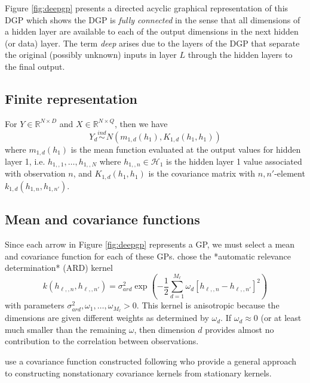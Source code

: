 \documentclass{article}
\newcommand{\ind}{\stackrel{ind}{\sim}}
\begin{document}
Figure \ref{fig:deepgp} presents a directed acyclic graphical representation
of this DGP which shows the DGP is \emph{fully connected} in the sense that all 
dimensions of a hidden layer are available to each of the output dimensions 
in the next hidden (or data) layer. 
The term \emph{deep} arises due to the layers of the DGP that separate
the original (possibly unknown) inputs in layer $L$ through the hidden layers
to the final output.







\subsection{Finite representation}

For $Y \in \mathbb{R}^{N \times D}$ and $X\in \mathbb{R}^{N\times Q}$,
then we have 
\[
Y_d \ind N(m_{1,d}(h_1), K_{1,d}(h_1,h_1))
\]
where 
$m_{1,d}(h_1)$ is the mean function evaluated at the output values for 
hidden layer 1, i.e. $h_{1,,1},\ldots,h_{1,,N}$ where $h_{1,,n}\in \mathcal{H}_1$
is the hidden layer 1 value associated with observation $n$, and 
$K_{1,d}(h_1,h_1)$ is the covariance matrix with $n,n'$-element
$k_{1,d}(h_{1,n},h_{1,n'})$.


\subsection{Mean and covariance functions}

Since each arrow in Figure \ref{fig:deepgp} represents a GP, 
we must select a mean and covariance function for each of these GPs. 
\cite{damianou2013deep} chose the *automatic relevance determination* (ARD) 
kernel
\[
k(h_{\ell,,n},h_{\ell,,n'}) = 
\sigma^2_{ard} \exp\left(-\frac{1}{2} \sum_{d=1}^{M_\ell} \omega_d \left[ h_{\ell,,n} - h_{\ell,,n'} \right]^2\right)
\]
with parameters $\sigma^2_{ard},\omega_1,\ldots,\omega_{M_\ell} > 0$.
This kernel is anisotropic because the dimensions are given different weights
as determined by $\omega_d$.
If $\omega_d \approx 0$ (or at least much smaller than the remaining $\omega$, 
then dimension $d$ provides almost no contribution to the correlation between
observations.

\cite{dunlop2018deep} use a covariance function constructed following 
\cite{paciorek2004nonstationary} who provide a general approach to constructing
nonstationary covariance kernels from stationary kernels.
\end{document}
